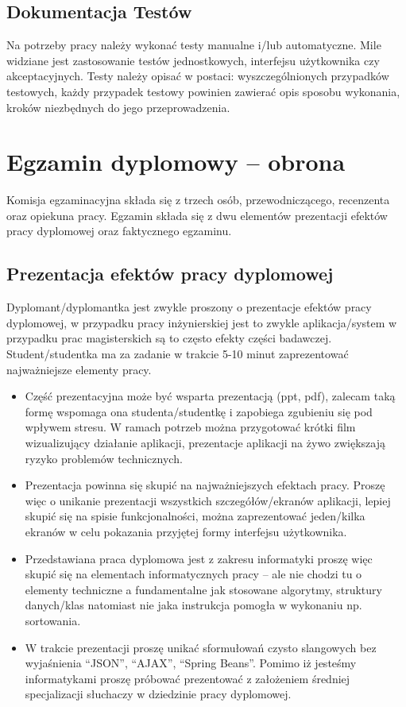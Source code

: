 \documentclass[12pt,a4paper]{article}
\begin{document}
\subsection{Dokumentacja Testów}

Na potrzeby pracy należy wykonać testy manualne i/lub automatyczne. Mile widziane jest zastosowanie testów jednostkowych, interfejsu użytkownika czy akceptacyjnych. Testy należy opisać w postaci: wyszczególnionych przypadków testowych, każdy przypadek testowy powinien zawierać opis sposobu wykonania, kroków niezbędnych do jego przeprowadzenia.


\section{Egzamin dyplomowy -- obrona}

Komisja egzaminacyjna składa się z trzech osób, przewodniczącego, recenzenta oraz opiekuna pracy. Egzamin składa się z dwu elementów prezentacji efektów pracy dyplomowej oraz faktycznego egzaminu.

\subsection{Prezentacja efektów pracy dyplomowej}
Dyplomant/dyplomantka jest zwykle proszony o prezentacje efektów pracy dyplomowej, w przypadku pracy inżynierskiej jest to zwykle aplikacja/system w przypadku prac magisterskich są to często efekty części badawczej. Student/studentka ma za zadanie w trakcie 5-10 minut zaprezentować najważniejsze elementy pracy.

\begin{itemize}
\item Część prezentacyjna może być wsparta prezentacją (ppt, pdf), zalecam taką formę wspomaga ona studenta/studentkę i zapobiega zgubieniu się pod wpływem stresu. W ramach potrzeb można przygotować krótki film wizualizujący działanie aplikacji, prezentacje aplikacji na żywo zwiększają ryzyko problemów technicznych.

\item Prezentacja powinna się skupić na najważniejszych efektach pracy. Proszę więc o unikanie prezentacji wszystkich szczegółów/ekranów aplikacji, lepiej skupić się na spisie funkcjonalności, można zaprezentować jeden/kilka ekranów w celu pokazania przyjętej formy interfejsu użytkownika.

\item Przedstawiana praca dyplomowa jest z zakresu informatyki proszę więc skupić się na elementach informatycznych pracy -- ale nie chodzi tu o elementy techniczne a fundamentalne jak stosowane algorytmy, struktury danych/klas natomiast nie jaka instrukcja pomogła w wykonaniu np. sortowania.

\item W trakcie prezentacji proszę unikać sformułowań czysto slangowych bez wyjaśnienia ``JSON'', ``AJAX'', ``Spring Beans''. Pomimo iż jesteśmy informatykami proszę próbować prezentować z założeniem średniej specjalizacji słuchaczy w dziedzinie pracy dyplomowej.
\end{itemize}
\end{document}
